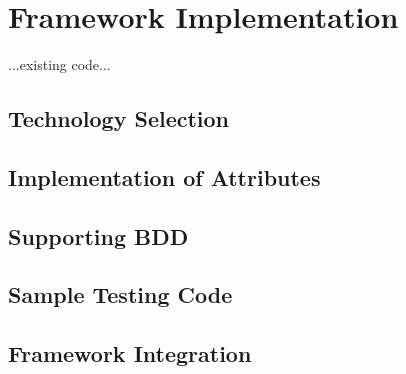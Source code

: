 
\chapter{Framework Implementation\label{chap:framework_implementation}}

...existing code...

\section{Technology Selection}


\section{Implementation of Attributes}


\section{Supporting BDD}


\section{Sample Testing Code}


\section{Framework Integration}

